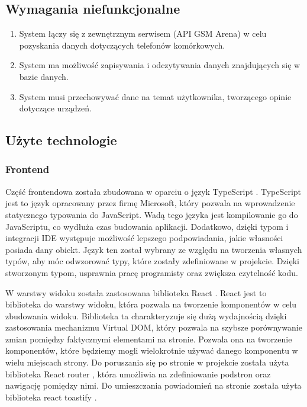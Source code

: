 \subsection{Wymagania niefunkcjonalne}
\begin{enumerate}
    \item System łączy się z zewnętrznym serwisem (API GSM Arena) w celu pozyskania danych dotyczących telefonów komórkowych.
    \item System ma możliwość zapisywania i odczytywania danych znajdujących się w bazie danych.
    \item System musi przechowywać dane na temat użytkownika, tworzącego opinie dotyczące urządzeń.
\end{enumerate}

\subsection{Użyte technologie}
\subsubsection{Frontend}
Część frontendowa została zbudowana w oparciu o język TypeScript \cite{TypeScript}. TypeScript jest to język opracowany przez firmę Microsoft, który pozwala na wprowadzenie statycznego typowania do JavaScript. Wadą tego języka jest kompilowanie go do JavaScriptu, co wydłuża czas budowania aplikacji. Dodatkowo, dzięki typom i integracji IDE występuje możliwość lepszego podpowiadania, jakie własności posiada dany obiekt.
Język ten został wybrany ze względu na tworzenia własnych typów, aby móc odwzorować typy, które zostały zdefiniowane w projekcie. Dzięki stworzonym typom, usprawnia pracę programisty oraz zwiększa czytelność kodu. 

W warstwy widoku została zastosowana biblioteka React \cite{React}. React jest to biblioteka do warstwy widoku, która pozwala na tworzenie komponentów w celu zbudowania widoku. Biblioteka ta charakteryzuje się dużą wydajnością dzięki zastosowania mechanizmu Virtual DOM, który pozwala na szybsze porównywanie zmian pomiędzy faktycznymi elementami na stronie. Pozwala ona na tworzenie komponentów, które będziemy mogli wielokrotnie używać danego komponentu w wielu miejscach strony. Do poruszania się po stronie w projekcie została użyta biblioteka React router \cite{react_router}, która umożliwia na zdefiniowanie podstron oraz nawigację pomiędzy nimi. Do umieszczania powiadomień na stronie została użyta biblioteka react toastify \cite{react_toastify}.

